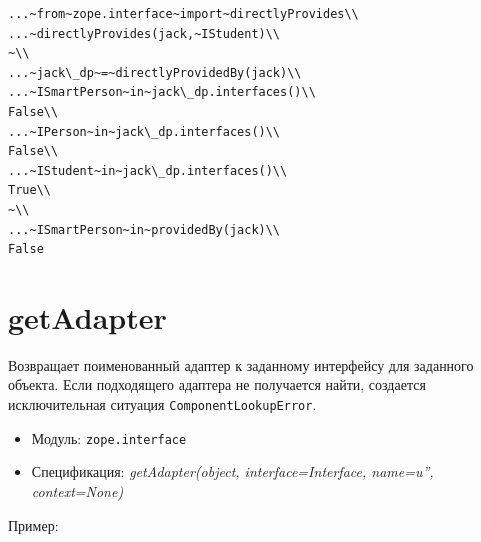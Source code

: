 \documentclass[a4paper,openany,twoside,draft]{book}
\providecommand*{\DUroletitlereference}[1]{\textsl{#1}}
\begin{document}
\begin{verbatim}
...~from~zope.interface~import~directlyProvides\\
...~directlyProvides(jack,~IStudent)\\
~\\
...~jack\_dp~=~directlyProvidedBy(jack)\\
...~ISmartPerson~in~jack\_dp.interfaces()\\
False\\
...~IPerson~in~jack\_dp.interfaces()\\
False\\
...~IStudent~in~jack\_dp.interfaces()\\
True\\
~\\
...~ISmartPerson~in~providedBy(jack)\\
False
\end{verbatim}


\section*{getAdapter%
  \label{getadapter}%
}

Возвращает поименованный адаптер к заданному интерфейсу для заданного
объекта.  Если подходящего адаптера не получается найти, создается
исключительная ситуация \texttt{ComponentLookupError}.

\begin{itemize}

\item Модуль: \texttt{zope.interface}

\item Спецификация: \DUroletitlereference{getAdapter(object, interface=Interface, name=u'', context=None)}

\end{itemize}

Пример:
\end{document}
